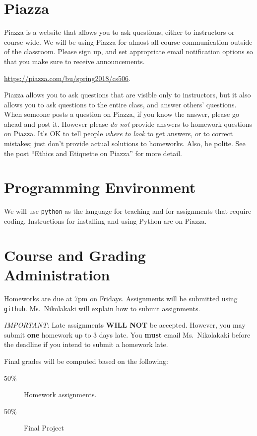 \documentclass[11pt]{article}
\begin{document}
\section*{Piazza}

Piazza is a website that allows you to ask questions, either to
instructors or course-wide.  We will be using Piazza for almost all course
communication outside of the classroom. Please sign up, and set
appropriate email notification options so that you make sure to
receive announcements.

\url{https://piazza.com/bu/spring2018/cs506}. 

Piazza allows you to ask questions that are visible only to
instructors, but it also allows you to ask questions to the entire
class, and answer others' questions. When someone posts a question on
Piazza, if you know the answer, please go ahead and post it.  However
please \emph{do not} provide answers to homework questions on Piazza.
It's OK to tell people \emph{where to look} to get answers, or to
correct mistakes; just don't provide actual solutions to
homeworks. Also, be polite. See the post ``Ethics and Etiquette on Piazza'' 
for more detail.

\section*{Programming Environment}

We will use \texttt{python} as the language for teaching and for
assignments that require coding.    Instructions for installing and
using Python are on Piazza.

\section*{Course and Grading Administration}

Homeworks are due at 7pm on Fridays.
Assignments will be submitted using \texttt{github}.   Ms.\ Nikolakaki will
explain how to submit assignments.  

\emph{IMPORTANT:} Late assignments \textbf{WILL NOT} be accepted. 
However, you may submit \textbf{one} homework up to 3 days late.   You
\textbf{must} email Ms.\ Nikolakaki before the deadline if you intend to
submit a homework late. 

Final grades will be computed based on the following:
\begin{description}
\item[50\%] Homework assignments.  
\item[50\%] Final Project
\end{description}
\end{document}
